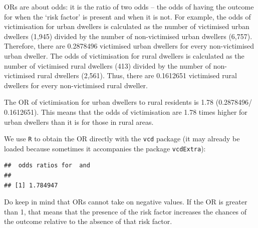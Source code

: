 \documentclass[
]{book}
\newenvironment{Shaded}{\begin{snugshade}}{\end{snugshade}}
\newcommand{\AttributeTok}[1]{\textcolor[rgb]{0.77,0.63,0.00}{#1}}
\newcommand{\CommentTok}[1]{\textcolor[rgb]{0.56,0.35,0.01}{\textit{#1}}}
\newcommand{\ConstantTok}[1]{\textcolor[rgb]{0.00,0.00,0.00}{#1}}
\newcommand{\FloatTok}[1]{\textcolor[rgb]{0.00,0.00,0.81}{#1}}
\newcommand{\FunctionTok}[1]{\textcolor[rgb]{0.00,0.00,0.00}{#1}}
\newcommand{\NormalTok}[1]{#1}
\newcommand{\OtherTok}[1]{\textcolor[rgb]{0.56,0.35,0.01}{#1}}
\newcommand{\SpecialCharTok}[1]{\textcolor[rgb]{0.00,0.00,0.00}{#1}}
\begin{document}
ORs are about odds: it is the ratio of two odds -- the odds of having the outcome for when the `risk factor' is present and when it is not. For example, the odds of victimisation for urban dwellers is calculated as the number of victimised urban dwellers (1,945) divided by the number of non-victimised urban dwellers (6,757). Therefore, there are 0.2878496 victimised urban dwellers for every non-victimised urban dweller. The odds of victimisation for rural dwellers is calculated as the number of victimised rural dwellers (413) divided by the number of non-victimised rural dwellers (2,561). Thus, there are 0.1612651 victimised rural dwellers for every non-victimised rural dweller.

The OR of victimisation for urban dwellers to rural residents is 1.78 (0.2878496/ 0.1612651). This means that the odds of victimisation are 1.78 times higher for urban dwellers than it is for those in rural areas.

We use \texttt{R} to obtain the OR directly with the \texttt{vcd} package (it may already be loaded because sometimes it accompanies the package \texttt{vcdExtra}):

\begin{Shaded}
\end{Shaded}

\begin{verbatim}
##  odds ratios for  and  
## 
## [1] 1.784947
\end{verbatim}

Do keep in mind that ORs cannot take on negative values. If the OR is greater than 1, that means that the presence of the risk factor increases the chances of the outcome relative to the absence of that risk factor.
\end{document}
